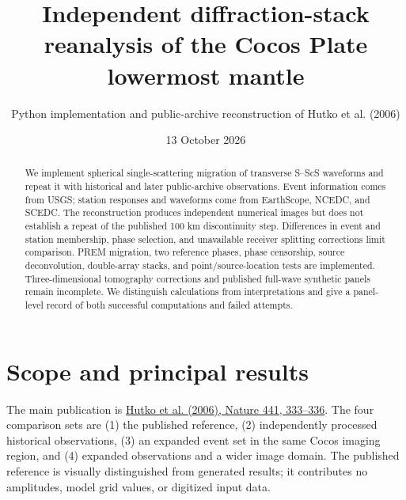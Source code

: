 \documentclass[10pt]{article}
\begin{document}
\title{Independent diffraction-stack reanalysis of the Cocos Plate lowermost mantle}
\author{Python implementation and public-archive reconstruction of Hutko et al. (2006)}
\date{13 October 2026}\maketitle
\begin{abstract}
We implement spherical single-scattering migration of transverse S--ScS waveforms
and repeat it with historical and later public-archive observations. Event information
comes from USGS; station responses and waveforms come from EarthScope, NCEDC, and
SCEDC. The reconstruction produces independent numerical images but does not
establish a repeat of the published 100 km discontinuity step. Differences in
event and station membership, phase selection, and unavailable receiver splitting
corrections limit comparison. PREM migration, two reference phases, phase censorship,
source deconvolution, double-array stacks, and point/source-location tests are
implemented. Three-dimensional tomography corrections and published full-wave
synthetic panels remain incomplete. We distinguish calculations from interpretations
and give a panel-level record of both successful computations and failed attempts.
\end{abstract}
\section{Scope and principal results}
The main publication is \href{https://doi.org/10.1038/nature04757}{Hutko et al. (2006),
Nature 441, 333--336}. The four comparison sets are (1) the published reference,
(2) independently processed historical observations, (3) an expanded event set
in the same Cocos imaging region, and (4) expanded observations and a wider image
domain. The published reference is visually distinguished from generated results;
it contributes no amplitudes, model grid values, or digitized input data.
\end{document}
